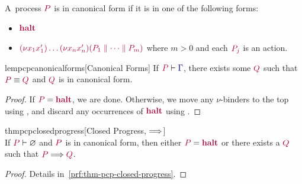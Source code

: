 \documentclass[main.tex]{subfiles}
\begin{document}
\begin{definition}
  \label{def:pcp-canonical-forms}
  A~process $\tm{P}$ is in canonical form if it is in one of the following forms:
  \begin{itemize}[noitemsep,topsep=0pt,parsep=0pt,partopsep=0pt]
  \item
    $\tm{\halt}$
  \item
    $\tm{\res{x_1}{x'_1}{\dots\res{x_n}{x'_n}{(P_1 \parallel\dots\parallel P_m)}}}$
    where $m>0$ and each $\tm{P_j}$ is an action.
  \end{itemize}
\end{definition}

\begin{restatablelemma}{lempcpcanonicalforms}[Canonical Forms]
  \label{lem:pcp-canonical-forms}
  If $\seq{P}{\ty{\Gamma}}$, there exists some $\tm{Q}$ such that $\tm{P}\equiv\tm{Q}$ and $\tm{Q}$ is in canonical form.
\end{restatablelemma}
\begin{proof}
  If $\tm{P}=\tm{\halt}$, we are done. Otherwise, we move any $\nu$-binders to the top using , and discard any occurrences of $\tm{\halt}$ using .
\end{proof}

\begin{restatabletheorem}{thmpcpclosedprogress}[Closed Progress, $\Longrightarrow$]
  \label{thm:pcp-closed-progress}
  \hfill\\%
  If $\seq{P}{\emptyenv}$ and $\tm{P}$ is in canonical form, then either $\tm{P}=\tm{\halt}$ or there exists a $\tm{Q}$ such that $\tm{P}\red\tm{Q}$.
\end{restatabletheorem}
\begin{proof}
  Details in~\cref{prf:thm-pcp-closed-progress}.
\end{proof}
\end{document}

